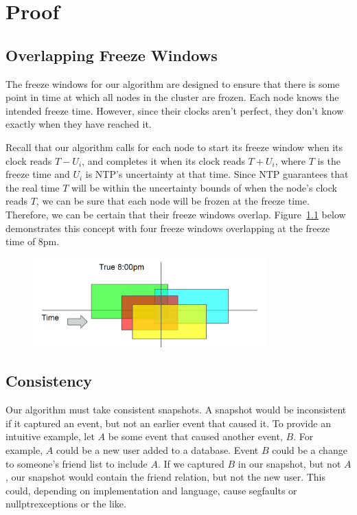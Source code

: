 \chapter{Proof}
\label{sec:proof}

\section{Overlapping Freeze Windows}

The freeze windows for our algorithm are designed to ensure
that there is some point in time at which all nodes in the cluster are
frozen. Each node knows the intended freeze time. However, since their
clocks aren't perfect, they don't know exactly when they have reached it.

Recall that our algorithm calls for each node to start its freeze
window when its clock reads $T - U_i$, and completes it when its clock
reads $T + U_i$, where $T$ is the freeze time and $U_i$ is NTP's uncertainty
at that time. Since NTP guarantees that the real time $T$ will be within
the uncertainty bounds of when the node's clock reads $T$, we can be
sure that each node will be frozen at the freeze time. Therefore, we
can be certain that their freeze windows overlap. 
Figure~\ref{fig:overlapping-windows} below
demonstrates this concept with four freeze windows overlapping at the freeze 
time of 8pm.

\begin{figure}[h]
  \centering
  \caption{}
  \label{fig:overlapping-windows}
  \includegraphics[width=0.8\textwidth]{overlapping-windows.png}
\end{figure}

\section{Consistency}

Our algorithm must take consistent snapshots. A snapshot would be
inconsistent if it captured an event, but not an earlier event that
caused it. To provide an intuitive example, let $A$ be some event that
caused another event, $B$.  For example, $A$ could be a new user added
to a database. Event $B$ could be a change to someone's friend list to
include $A$. If we captured $B$ in our snapshot, but not $A$, our
snapshot would contain the friend relation, but not the new user. This
could, depending on implementation and language, cause segfaults or
nullptrexceptions or the like.

